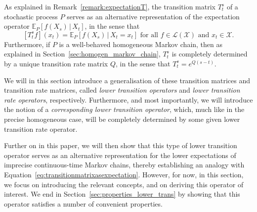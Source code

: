 \documentclass[10pt,a4paper]{paper}
\theoremstyle{definition}
\newcommand{\states}{\mathcal{X}}
\newcommand{\processes}{\mathbb{P}}
\newcommand{\wprocesses}{\processes^{\mathrm{W}}}
\newcommand{\wmprocesses}{\processes^{\mathrm{WM}}}
\newcommand{\gambles}{\mathcal{L}}
\newcommand{\gamblesX}{\gambles(\states)}
\newcommand{\rateset}{\mathcal{Q}}
\begin{document}

As explained in Remark~\ref{remark:expectationT}, the transition matrix $T_t^s$ of a stochastic process $P$ serves as an alternative representation of the expectation operator $\mathbb{E}_P[f(X_s)\,\vert\,X_t]$, in the sense that
\begin{equation}\label{eq:transitionmatrixasexpectation}
[T_t^sf](x_t)=\mathbb{E}_P[f(X_s)\,\vert\,X_t=x_t]
\text{ for all $f\in\gamblesX$ and $x_t\in\states$.}
\end{equation}
Furthermore, if $P$ is a well-behaved homogeneous Markov chain, then as explained in Section~\ref{sec:homogen_markov_chain}, $T_t^s$ is completely determined by a unique transition rate matrix $Q$, in the sense that $T_t^s=e^{Q(s-t)}$.

We will in this section introduce a generalisation of these transition matrices and transition rate matrices, called \emph{lower transition operators} and \emph{lower transition rate operators}, respectively. Furthermore, and most importantly, we will introduce the notion of a \emph{corresponding lower transition operator}, which, much like in the precise homogeneous case, will be completely determined by some given lower transition rate operator. 

Further on in this paper, we will then  show that this type of lower transition operator serves as an alternative representation for the lower expectations of imprecise continuous-time Markov chains, thereby establishing an analogy with Equation~\eqref{eq:transitionmatrixasexpectation}. However, for now, in this section, we focus on introducing the relevant concepts, and on deriving this operator of interest. We end in Section~\ref{sec:properties_lower_trans} by showing that this operator satisfies a number of convenient properties.
\end{document}
